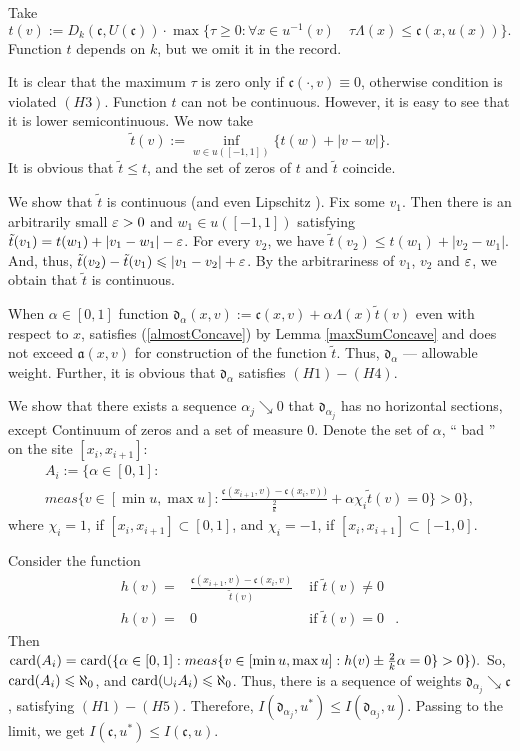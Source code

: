 Take
$$t(v):=D_k(\mathfrak c, U(\mathfrak c)) \cdot \max\{\tau \ge 0: \forall x \in u^{-1}(v) \quad \tau \Lambda(x) \le \mathfrak c(x, u(x))\}.$$
Function $t$ depends on $k$, but we omit it in the record.

It is clear that the maximum $\tau$ is zero only if $\mathfrak c(\cdot, v) \equiv 0$, otherwise condition is violated
$(H3)$.
Function $t$ can not be continuous. However, it is easy to see that it is lower semicontinuous.
We now take
$$\tilde{t}(v) := \inf_{w \in u([-1, 1])} \{t(w) + |v - w|\}.$$
It is obvious that $\tilde{t} \le t$, and the set of zeros of $t$ and $\tilde{t}$ coincide.

We show that $\tilde{t}$ is continuous (and even Lipschitz ).
Fix some $v_1$.
Then there is an arbitrarily small $\varepsilon > 0$ and $w_1 \in u([-1, 1])$
satisfying $\tilde{t}(v_1) = t(w_1) + |v_1 - w_1| - \varepsilon$.
For every $v_2$, we have $\tilde{t}(v_2) \le t(w_1) + |v_2 - w_1|$.
And, thus, $\tilde{t}(v_2) - \tilde{t}(v_1) \leqslant |v_1 - v_2| + \varepsilon$.
By the arbitrariness of $v_1$, $v_2$ and $\varepsilon$, we obtain that $\tilde{t}$ is continuous.

When $\alpha \in [0, 1]$ function $\mathfrak d_\alpha(x, v) := \mathfrak c(x, v) + \alpha \Lambda(x) \tilde{t}(v)$
even with respect to $x$, satisfies (\ref{almostConcave}) by Lemma \ref{maxSumConcave}
and does not exceed $\mathfrak a(x, v)$ for construction of the function $\tilde{t}$.
Thus, $\mathfrak d_\alpha$ --- allowable weight.
Further, it is obvious that $\mathfrak d_\alpha$ satisfies $(H1)-(H4)$.

We show that there exists a sequence $\alpha_j \searrow 0$
that $\mathfrak d_{\alpha_j}$ has no horizontal sections, except
Continuum of zeros and a set of measure $0$.
Denote the set of $\alpha$, `` bad '' on the site $[x_i, x_{i + 1}]$:
\begin{multline*}
A_i := \big \{\alpha \in [0, 1]: \\
meas \{v \in [\min u, \max u]: \frac{\mathfrak c (x_{i + 1}, v) - \mathfrak c (x_i, v))}{\frac{2}{k}} + \alpha \chi_i \tilde{t} (v) = 0 \} > 0 \big \},
\end{multline*}
where $\chi_i = 1$, if $[x_i, x_{i + 1}] \subset [0, 1]$, and $\chi_i = -1$, if $[x_i, x_{i + 1}] \subset [-1, 0]$.

Consider the function
$$
\begin{aligned}
h (v) = & \frac{\mathfrak c (x_{i + 1}, v) - \mathfrak c (x_i, v)}{\tilde{t} (v)} & \text{ if } \tilde{t} ( v) \neq 0 & \\
h (v) = & 0 & \text{ if } \tilde{t} (v) = 0 &.
\end{aligned}
$$
Then $\card(A_i) = \card(\{ \alpha \in [0, 1]: meas \{ v \in [\min u, \max u]: h(v) \pm \frac{2}{k} \alpha = 0 \} > 0 \}).$
So, ${\rm card}(A_i) \leqslant \aleph_0$, and ${\rm card}(\cup_i A_i) \leqslant \aleph_0$.
Thus, there is a sequence of weights $\mathfrak d_{\alpha_j} \searrow \mathfrak c$, satisfying $(H1)-(H5)$.
Therefore, $I(\mathfrak d_{\alpha_j}, u^*) \le I(\mathfrak d_{\alpha_j}, u)$.
Passing to the limit, we get $I(\mathfrak c, u^*) \le I(\mathfrak c, u)$.

